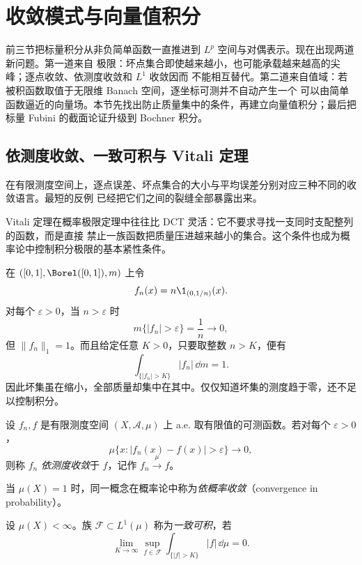 \section{收敛模式与向量值积分}\label{sec:03-04}

前三节把标量积分从非负简单函数一直推进到 $L^p$ 空间与对偶表示。现在出现两道新问题。第一道来自
极限：坏点集合即使越来越小，也可能承载越来越高的尖峰；逐点收敛、依测度收敛和 $L^1$ 收敛因而
不能相互替代。第二道来自值域：若被积函数取值于无限维 Banach 空间，逐坐标可测并不自动产生一个
可以由简单函数逼近的向量场。本节先找出防止质量集中的条件，再建立向量值积分；最后把标量
Fubini 的截面论证升级到 Bochner 积分。


\subsection{依测度收敛、一致可积与 Vitali 定理}\label{subsec:3-4-1}

在有限测度空间上，逐点误差、坏点集合的大小与平均误差分别对应三种不同的收敛语言。最短的反例
已经把它们之间的裂缝全部暴露出来。

Vitali 定理在概率极限定理中往往比 DCT 灵活：它不要求寻找一支同时支配整列的函数，而是直接
禁止一族函数把质量压进越来越小的集合。这个条件也成为概率论中控制积分极限的基本紧性条件。

\begin{example}[缩窄而升高的尖峰]\label{ex:3-4-1-1}
在 $([0,1],\Borel([0,1]),m)$ 上令
\[
  f_n(x)=n\1_{(0,1/n)}(x).
\]
对每个 $\varepsilon>0$，当 $n>\varepsilon$ 时
\[
 m\{|f_n|>\varepsilon\}=\frac1n\longrightarrow0,
\]
但 $\|f_n\|_1=1$。而且给定任意 $K>0$，只要取整数 $n>K$，便有
\[
 \int_{\{|f_n|>K\}}|f_n|\,\dd m=1.
\]
因此坏集虽在缩小，全部质量却集中在其中。仅仅知道坏集的测度趋于零，还不足以控制积分。
\end{example}

\begin{definition}[依测度收敛]\label{def:3-4-1-1}
设 $f_n,f$ 是有限测度空间 $(X,\mathcal A,\mu)$ 上 a.e. 取有限值的可测函数。若对每个
$\varepsilon>0$，
\[
  \mu\{x:|f_n(x)-f(x)|>\varepsilon\}\longrightarrow0,
\]
则称 $f_n$ \emph{依测度收敛}于 $f$，记作 $f_n\xrightarrow{\mu}f$。
\end{definition}

当 $\mu(X)=1$ 时，同一概念在概率论中称为\emph{依概率收敛}（convergence in probability）。

\begin{definition}[一致可积]\label{def:3-4-1-2}
设 $\mu(X)<\infty$。族 $\mathcal F\subset L^1(\mu)$ 称为\emph{一致可积}，若
\[
  \lim_{K\to\infty}\sup_{f\in\mathcal F}
  \int_{\{|f|>K\}}|f|\,\dd\mu=0.
  \tag{3.4.1}\label{eq:ui-tail-definition}
\]
\end{definition}

